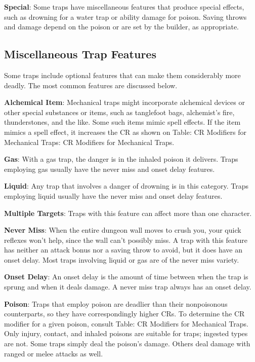 \textbf{Special}: Some traps have miscellaneous features that produce special effects, such as drowning for a water trap or ability damage for poison. Saving throws and damage depend on the poison or are set by the builder, as appropriate.
				
\subsection{Miscellaneous Trap Features}

				
Some traps include optional features that can make them considerably more deadly. The most common features are discussed below.
				
\textbf{Alchemical Item}: Mechanical traps might incorporate alchemical devices or other special substances or items, such as tanglefoot bags, alchemist's fire, thunderstones, and the like. Some such items mimic spell effects. If the item mimics a spell effect, it increases the CR as shown on Table: CR Modifiers for Mechanical Traps: CR Modifiers for Mechanical Traps.
				
\textbf{Gas}: With a gas trap, the danger is in the inhaled poison it delivers. Traps employing gas usually have the never miss and onset delay features.
				
\textbf{Liquid}: Any trap that involves a danger of drowning is in this category. Traps employing liquid usually have the never miss and onset delay features. 
				
\textbf{Multiple Targets}: Traps with this feature can affect more than one character.
				
\textbf{Never Miss}: When the entire dungeon wall moves to crush you, your quick reflexes won't help, since the wall can't possibly miss. A trap with this feature has neither an attack bonus nor a saving throw to avoid, but it does have an onset delay. Most traps involving liquid or gas are of the never miss variety. 
				
\textbf{Onset Delay}: An onset delay is the amount of time between when the trap is sprung and when it deals damage. A never miss trap always has an onset delay.
				
\textbf{Poison}: Traps that employ poison are deadlier than their nonpoisonous counterparts, so they have correspondingly higher CRs. To determine the CR modifier for a given poison, consult Table: CR Modifiers for Mechanical Traps. Only injury, contact, and inhaled poisons are suitable for traps; ingested types are not. Some traps simply deal the poison's damage. Others deal damage with ranged or melee attacks as well.
				
